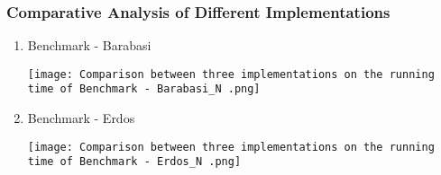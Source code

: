 \documentclass{article}
\begin{document}
    \subsubsection{Comparative Analysis of Different Implementations}
    \begin{enumerate}
        \item Benchmark - Barabasi
        \begin{center}
            \texttt{[image: Comparison between three implementations on the running time of Benchmark - Barabasi\_N .png]}
        \end{center}
        
        \item Benchmark - Erdos
        \begin{center}
            \texttt{[image: Comparison between three implementations on the running time of Benchmark - Erdos\_N .png]}
        \end{center}
    \end{enumerate}
    
    \clearpage
    
    
    
    
\end{document}
